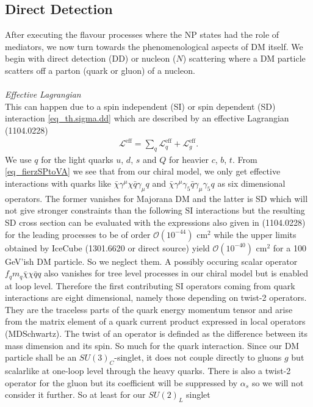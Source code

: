 \subsection{Direct Detection}
After executing the flavour processes where the NP states had the role of mediators, we now turn towards the phenomenological aspects of DM itself.
We begin with direct detection (DD) or nucleon ($N$) scattering where a DM particle scatters off a parton (quark or gluon) of a nucleon. 
\\ \\ \textit{Effective Lagrangian}\\
This can happen
due to a spin independent (SI) or spin dependent (SD) interaction \eqref{eq_th.sigma.dd} which are described by an effective Lagrangian (1104.0228)
\begin{align}
 \mathcal{L}^\text{eff} = \sum\limits_{q} \mathcal{L}^\text{eff}_q + \mathcal{L}^\text{eff}_g.
\end{align}
We use $q$ for the light quarks $u$, $d$, $s$ and $Q$ for heavier $c$, $b$, $t$. From \eqref{eq_fierzSPtoVA} we see that from our chiral model, 
we only get effective interactions with quarks like $\bar \chi\gamma^\mu\chi \bar q\gamma_\mu q$ and $\bar \chi\gamma^\mu\gamma_5 \bar q\gamma_\mu \gamma_5 q$
as six dimensional operators. The former vanishes for Majorana DM and the latter is SD which will not give stronger constraints than the following SI
interactions but the resulting SD cross section can be evaluated with the expressions also given in (1104.0228) for the leading processes to be of
order $\mathcal{O}(10^{-44})$ cm$^2$ while the upper limits obtained by IceCube (1301.6620 or direct source) yield $\mathcal{O}(10^{-40})$ cm$^2$ for 
a 100 GeV'ish DM particle.
So we neglect them. A possibly occuring scalar operator $f_q m_q\bar \chi \chi \bar q q$ also vanishes for tree level processes in our chiral model
but is enabled at loop level. Therefore the first contributing
SI operators coming from quark interactions are eight dimensional, namely those depending on twist-2 operators. They are the traceless parts of the
quark energy momentum tensor and arise from the matrix element of a quark current product expressed in local operators (MDSchwartz). The twist of 
an operator is definded as the difference between its mass dimension and its spin. So much for the quark interaction. Since our DM particle shall be an 
$SU(3)_C$-singlet, it does not couple directly to gluons $g$ but scalarlike at one-loop level through the heavy quarks. There is also a twist-2 
operator for the gluon but its coefficient will be suppressed by $\alpha_s$ so we will not consider it further. So at least for our $SU(2)_L$ singlet
